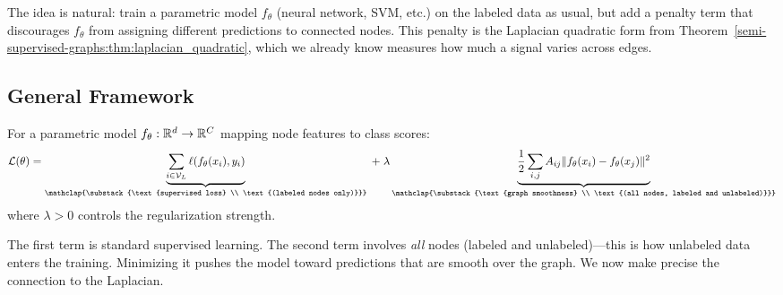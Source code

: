 \begin{notechapter}
The idea is natural: train a parametric model $f_\theta$ (neural network, SVM,
etc.) on the labeled data as usual, but add a penalty term that discourages
$f_\theta$ from assigning different predictions to connected nodes. This
penalty is the Laplacian quadratic form from Theorem~\ref{semi-supervised-graphs:thm:laplacian_quadratic},
which we already know measures how much a signal varies across edges.

\subsection{General Framework}

\begin{definition}
\label{semi-supervised-graphs:def:graph_reg}
For a parametric model $f_\theta: \mathbb{R}^d \to \mathbb{R}^C$ mapping node features to
class scores:
\begin{equation}
\label{semi-supervised-graphs:eq:graph_reg}
\mathcal{L}(\theta) = 
\underbrace{
    \sum_{i \in \mathcal{V}_L}\ell(f_\theta(x_i), y_i)}_{
        \mathclap{\substack{\text{supervised loss} \\
        \text{(labeled nodes only)}}}} \; + \;
\lambda\underbrace{\frac{1}{2}\sum_{i,j}A_{ij}\|f_\theta(x_i) - 
f_\theta(x_j)\|^2}_{\mathclap{\substack{\text{graph smoothness} \\
\text{(all nodes, labeled and unlabeled)}}}}
\end{equation}
where $\lambda > 0$ controls the regularization strength.
\end{definition}

The first term is standard supervised learning. The second term involves
\emph{all} nodes (labeled and unlabeled)---this is how unlabeled data enters
the training. Minimizing it pushes the model toward predictions that are smooth
over the graph. We now make precise the connection to the Laplacian.


\end{notechapter}
